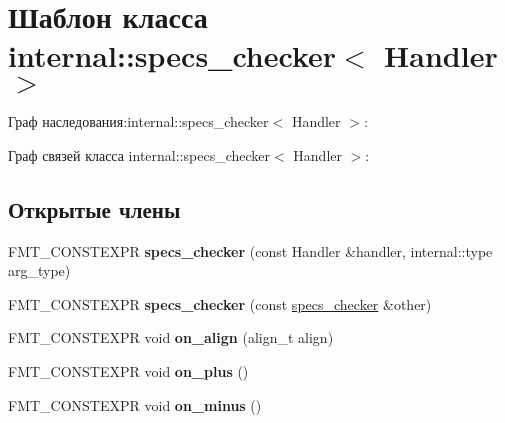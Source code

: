 \hypertarget{classinternal_1_1specs__checker}{}\section{Шаблон класса internal\+:\+:specs\+\_\+checker$<$ Handler $>$}
\label{classinternal_1_1specs__checker}


Граф наследования\+:internal\+:\+:specs\+\_\+checker$<$ Handler $>$\+:


Граф связей класса internal\+:\+:specs\+\_\+checker$<$ Handler $>$\+:
\subsection*{Открытые члены}
\begin{DoxyCompactItemize}
\item 
\mbox{\label{classinternal_1_1specs__checker_afe7e3d3c7f0acc86ba7febff36b44a83}} 
F\+M\+T\+\_\+\+C\+O\+N\+S\+T\+E\+X\+PR {\bfseries specs\+\_\+checker} (const Handler \&handler, internal\+::type arg\+\_\+type)
\item 
\mbox{\label{classinternal_1_1specs__checker_a0d84f57d4674c774d5c7ac8c45eb5bab}} 
F\+M\+T\+\_\+\+C\+O\+N\+S\+T\+E\+X\+PR {\bfseries specs\+\_\+checker} (const \hyperlink{classinternal_1_1specs__checker}{specs\+\_\+checker} \&other)
\item 
\mbox{\label{classinternal_1_1specs__checker_ae88f7c6b4dc3b8f9d37327fd5e85d17d}} 
F\+M\+T\+\_\+\+C\+O\+N\+S\+T\+E\+X\+PR void {\bfseries on\+\_\+align} (align\+\_\+t align)
\item 
\mbox{\label{classinternal_1_1specs__checker_a12d7b0e358cb4fa37ea1e743fc91df62}} 
F\+M\+T\+\_\+\+C\+O\+N\+S\+T\+E\+X\+PR void {\bfseries on\+\_\+plus} ()
\item 
\mbox{\label{classinternal_1_1specs__checker_ab52e2fc452636fd081d9392956dfe6e9}} 
F\+M\+T\+\_\+\+C\+O\+N\+S\+T\+E\+X\+PR void {\bfseries on\+\_\+minus} ()
\item 
\mbox{\label{classinternal_1_1specs__checker_ad3ad96ca1b6ccf5495de4aecbb1a4d7a}} 

\end{DoxyCompactItemize}

